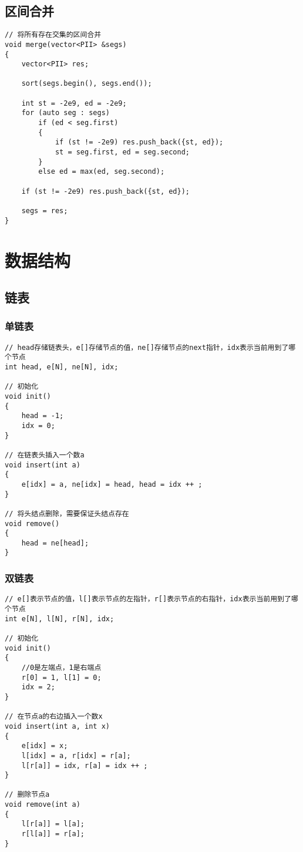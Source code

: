\documentclass[12pt,a4paper,UTF16]{ctexbook}
\theoremstyle{plain}
\begin{document}
\section{区间合并}
\begin{lstlisting}
// 将所有存在交集的区间合并
void merge(vector<PII> &segs)
{
    vector<PII> res;

    sort(segs.begin(), segs.end());

    int st = -2e9, ed = -2e9;
    for (auto seg : segs)
        if (ed < seg.first)
        {
            if (st != -2e9) res.push_back({st, ed});
            st = seg.first, ed = seg.second;
        }
        else ed = max(ed, seg.second);

    if (st != -2e9) res.push_back({st, ed});

    segs = res;
}
\end{lstlisting}

\chapter{数据结构}
\section{链表}
\subsection{单链表}
\begin{lstlisting}
// head存储链表头，e[]存储节点的值，ne[]存储节点的next指针，idx表示当前用到了哪个节点
int head, e[N], ne[N], idx;

// 初始化
void init()
{
    head = -1;
    idx = 0;
}

// 在链表头插入一个数a
void insert(int a)
{
    e[idx] = a, ne[idx] = head, head = idx ++ ;
}

// 将头结点删除，需要保证头结点存在
void remove()
{
    head = ne[head];
}
\end{lstlisting}
\subsection{双链表}
\begin{lstlisting}
// e[]表示节点的值，l[]表示节点的左指针，r[]表示节点的右指针，idx表示当前用到了哪个节点
int e[N], l[N], r[N], idx;

// 初始化
void init()
{
    //0是左端点，1是右端点
    r[0] = 1, l[1] = 0;
    idx = 2;
}

// 在节点a的右边插入一个数x
void insert(int a, int x)
{
    e[idx] = x;
    l[idx] = a, r[idx] = r[a];
    l[r[a]] = idx, r[a] = idx ++ ;
}

// 删除节点a
void remove(int a)
{
    l[r[a]] = l[a];
    r[l[a]] = r[a];
}
\end{lstlisting}
\end{document}
